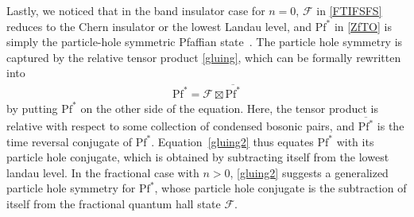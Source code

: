 Lastly, we noticed that in the band insulator case for $n=0$, $\mathcal{F}$ in \eqref{FTIFSFS} reduces to the Chern insulator or the lowest Landau level, and $\mathrm{Pf}^\ast$ in \eqref{ZfTO} is simply the particle-hole symmetric Pfaffian state~\cite{Son15,BarkeshliMulliganFisher15,WangSenthil16}. The particle hole symmetry is captured by the relative tensor product \eqref{gluing}, which can be formally rewritten into \begin{align}\mathrm{Pf}^\ast=\mathcal{F}\boxtimes\overline{\mathrm{Pf}^\ast}\label{gluing2}\end{align} by putting $\mathrm{Pf}^\ast$ on the other side of the equation. Here, the tensor product is relative with respect to some collection of condensed bosonic pairs, and $\overline{\mathrm{Pf}^\ast}$ is the time reversal conjugate of $\mathrm{Pf}^\ast$. Equation~\eqref{gluing2} thus equates $\mathrm{Pf}^\ast$ with its particle hole conjugate, which is obtained by subtracting itself from the lowest landau level. In the fractional case with $n>0$, \eqref{gluing2} suggests a generalized particle hole symmetry for $\mathrm{Pf}^\ast$, whose particle hole conjugate is the subtraction of itself from the fractional quantum hall state $\mathcal{F}$.